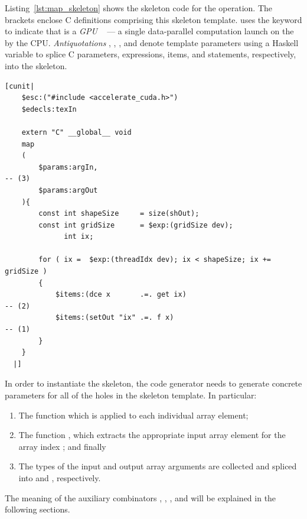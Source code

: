 Listing~\ref{lst:map_skeleton} shows the skeleton code for the 
operation. The \code{[cunit|...|]} brackets enclose \CUDA C definitions
comprising this skeleton template. \CUDA uses the  keyword to
indicate that  is a \emph{GPU} ~\cite{NVIDIA:2012wf}
--- a single data-parallel computation launch on the \GPU by the CPU.
\emph{Antiquotations} , ,
, and  denote template parameters using a
Haskell variable  to splice \CUDA C parameters, expressions, items,
and statements, respectively, into the skeleton.

\begin{lstlisting}[style=haskell,
    float,
    name=map_skeleton,
    label=lst:map_skeleton,
    caption={Accelerate CUDA skeleton for the \code{map} operation}]
[cunit|
    $esc:("#include <accelerate_cuda.h>")
    $edecls:texIn

    extern "C" __global__ void
    map
    (
        $params:argIn,                                                              -- (3)
        $params:argOut
    ){
        const int shapeSize     = size(shOut);
        const int gridSize      = $exp:(gridSize dev);
              int ix;

        for ( ix =  $exp:(threadIdx dev); ix < shapeSize; ix += gridSize )
        {
            $items:(dce x       .=. get ix)                                         -- (2)
            $items:(setOut "ix" .=. f x)                                            -- (1)
        }
    }
  |]
\end{lstlisting}

In order to instantiate the  skeleton, the code generator needs to
generate concrete parameters for all of the holes in the skeleton template. In
particular:
%
\begin{enumerate}
\item The function  which is applied to each individual array element;

\item The function , which extracts the appropriate input array
    element for the array index ; and finally

\item The types of the input and output array arguments are collected and
    spliced into  and , respectively.

\end{enumerate}
%
The meaning of the auxiliary combinators , , ,
and  will be explained in the following sections.

